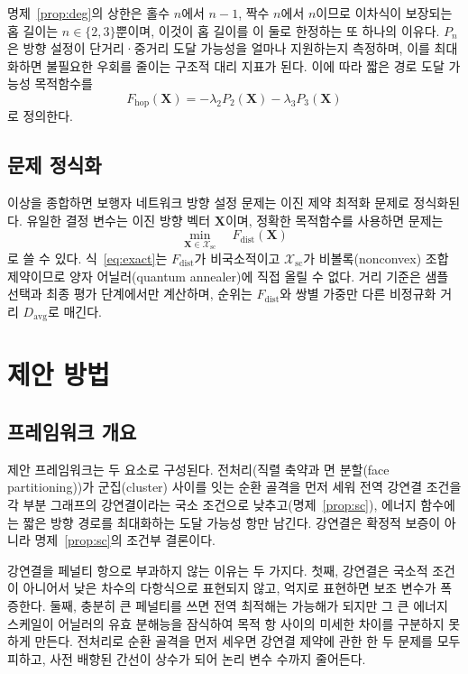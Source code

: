 \documentclass[twocolumn,a4paper]{article}
\begin{document}
명제~\ref{prop:deg}의 상한은 홀수 \(n\)에서 \(n-1\), 짝수 \(n\)에서 \(n\)이므로 이차식이 보장되는 홉 길이는 \(n\in\{2,3\}\)뿐이며, 이것이 홉 길이를 이 둘로 한정하는 또 하나의 이유다. \(P_n\)은 방향 설정이 단거리·중거리 도달 가능성을 얼마나 지원하는지 측정하며, 이를 최대화하면 불필요한 우회를 줄이는 구조적 대리 지표가 된다. 이에 따라 짧은 경로 도달 가능성 목적함수를
\begin{equation}
F_{\mathrm{hop}}(\mathbf{X})=-\lambda_2P_2(\mathbf{X})-\lambda_3P_3(\mathbf{X})
\end{equation}
로 정의한다.

\subsection{문제 정식화}

이상을 종합하면 보행자 네트워크 방향 설정 문제는 이진 제약 최적화 문제로 정식화된다. 유일한 결정 변수는 이진 방향 벡터 \(\mathbf{X}\)이며, 정확한 목적함수를 사용하면 문제는
\begin{equation}
\min_{\mathbf{X}\in\mathcal{X}_{\mathrm{sc}}}\quad F_{\mathrm{dist}}(\mathbf{X})
\label{eq:exact}
\end{equation}
로 쓸 수 있다. 식~\eqref{eq:exact}는 \(F_{\mathrm{dist}}\)가 비국소적이고 \(\mathcal{X}_{\mathrm{sc}}\)가 비볼록(nonconvex) 조합 제약이므로 양자 어닐러(quantum annealer)에 직접 올릴 수 없다. 거리 기준은 샘플 선택과 최종 평가 단계에서만 계산하며, 순위는 \(F_{\mathrm{dist}}\)와 쌍별 가중만 다른 비정규화 거리 \(D_{\mathrm{avg}}\)로 매긴다.

\section{제안 방법} \label{sec:method}

\subsection{프레임워크 개요}

제안 프레임워크는 두 요소로 구성된다. 전처리(직렬 축약과 면 분할(face partitioning))가 군집(cluster) 사이를 잇는 순환 골격을 먼저 세워 전역 강연결 조건을 각 부분 그래프의 강연결이라는 국소 조건으로 낮추고(명제~\ref{prop:sc}), 에너지 함수에는 짧은 방향 경로를 최대화하는 도달 가능성 항만 남긴다. 강연결은 확정적 보증이 아니라 명제~\ref{prop:sc}의 조건부 결론이다.

강연결을 페널티 항으로 부과하지 않는 이유는 두 가지다. 첫째, 강연결은 국소적 조건이 아니어서 낮은 차수의 다항식으로 표현되지 않고, 억지로 표현하면 보조 변수가 폭증한다. 둘째, 충분히 큰 페널티를 쓰면 전역 최적해는 가능해가 되지만 그 큰 에너지 스케일이 어닐러의 유효 분해능을 잠식하여 목적 항 사이의 미세한 차이를 구분하지 못하게 만든다. 전처리로 순환 골격을 먼저 세우면 강연결 제약에 관한 한 두 문제를 모두 피하고, 사전 배향된 간선이 상수가 되어 논리 변수 수까지 줄어든다.
\end{document}
